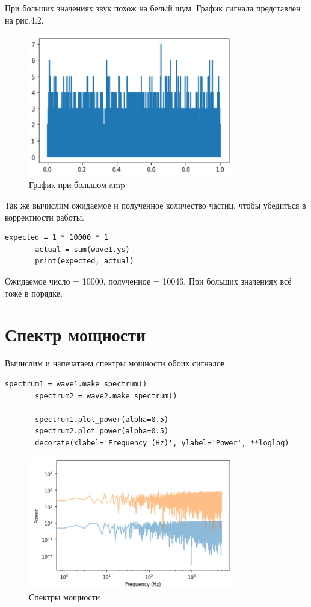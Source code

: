\documentclass[a4paper,12pt]{report}
\begin{document}
      При больших значениях звук похож на белый шум. График сигнала представлен на рис.4.2.
\begin{figure}[H]
        \centering
        \includegraphics[width=0.8\textwidth]{fig4-2.PNG}
        \caption{График при большом amp}
        \label{fig:fig4-2}
\end{figure}
    
    Так же вычислим ожидаемое и полученное количество частиц, чтобы убедиться в корректности работы.
\begin{lstlisting}[caption=Число частиц при малых значениях amp]
       expected = 1 * 10000 * 1
       actual = sum(wave1.ys)
       print(expected, actual)
\end{lstlisting} 

    Ожидаемое число = 10000, полученное = 10046. При больших значениях всё тоже в порядке. 
\section{Спектр мощности}
    Вычислим и напечатаем спектры мощности обоих сигналов.
\begin{lstlisting}[caption=Вычисление спектров мощности]
       spectrum1 = wave1.make_spectrum()
       spectrum2 = wave2.make_spectrum()

       spectrum1.plot_power(alpha=0.5)
       spectrum2.plot_power(alpha=0.5)
       decorate(xlabel='Frequency (Hz)', ylabel='Power', **loglog)
\end{lstlisting}
\begin{figure}[H]
        \centering
        \includegraphics[width=0.8\textwidth]{fig4-3.PNG}
        \caption{Спектры мощности}
        \label{fig:fig4-3}
\end{figure} 
\end{document}

